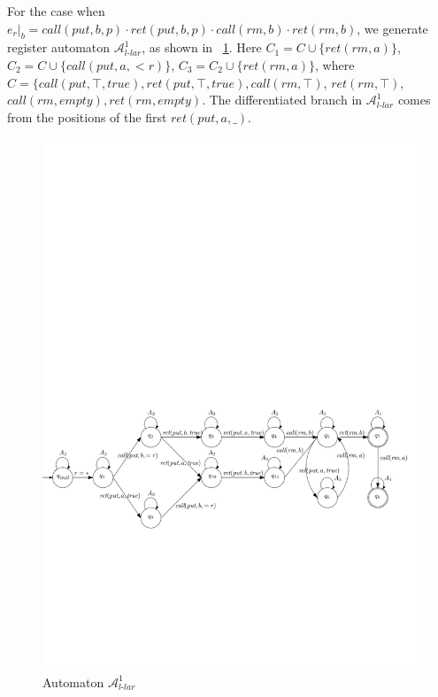 For the case when $e_r \vert_{b} = \textit{call}(\textit{put},b,p) \cdot \textit{ret}(\textit{put},b,p) \cdot \textit{call}(\textit{rm},b) \cdot \textit{ret}(\textit{rm},b)$, we generate register automaton $\mathcal{A}_{\textit{l-lar}}^1$, as shown in \figurename~\ref{fig:automata APQ1Lar-1}. Here $C_1 = C \cup \{ \textit{ret}(\textit{rm},a) \}$, $C_2 = C \cup \{ \textit{call}(\textit{put},a,<r) \}$, $C_3 = C_2 \cup \{ \textit{ret}(\textit{rm},a) \}$, where $C = \{ \textit{call}(\textit{put},\top,\textit{true}),\textit{ret}(\textit{put},\top,\textit{true}), \textit{call}(\textit{rm},\top)$, $\textit{ret}(\textit{rm},\top),$ $\textit{call}(\textit{rm},\textit{empty}),\textit{ret}(\textit{rm},\textit{empty})$. The differentiated branch in $\mathcal{A}_{\textit{l-lar}}^1$ comes from the positions of the first $\textit{ret}(\textit{put},a,\_)$.

\begin{figure}[htbp]
  \centering
  \includegraphics[width=1 \textwidth]{figures/PIC_AUTO_PQ1Lar-pprr.pdf}
  \caption{Automaton $\mathcal{A}_{\textit{l-lar}}^1$}
  \label{fig:automata APQ1Lar-1}
\end{figure}

